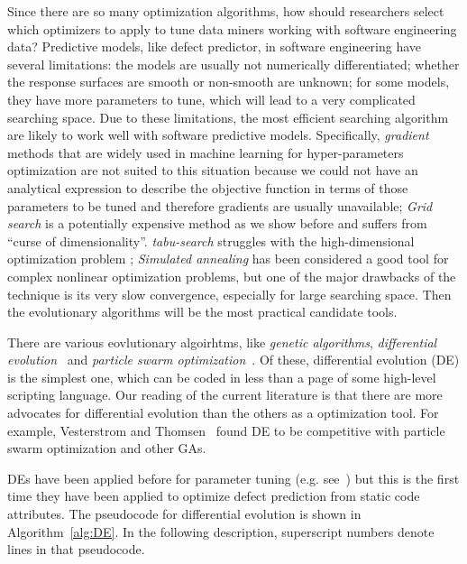 Since there are so many optimization algorithms, how should researchers
select which optimizers to apply to tune data miners working 
with software engineering data? Predictive models, like defect predictor,
in software engineering have several limitations: the models are usually not
numerically differentiated; whether the response surfaces are smooth or non-smooth are unknown;
for some models, they have more parameters to tune, which will lead to a very complicated searching space. Due to these limitations, the most efficient searching algorithm
are likely to work well with software predictive models. Specifically,
{\em gradient} methods that are widely used in machine learning\cite{bengio2000gradient,maclaurin2015gradient} for 
hyper-parameters optimization are not suited to this situation because we could not have an analytical expression
to describe the objective function in terms of those parameters to be tuned and therefore gradients are usually unavailable; 
{\em Grid search} is a potentially expensive method as we show before\cite{tantithamthavorn2016automated} and suffers from ``curse of dimensionality''.
{\em tabu-search} struggles with
the high-dimensional optimization problem \cite{mayer1998tabu}; {\em Simulated annealing} 
has been considered a good tool for complex nonlinear optimization problems\cite{fea02a,me07f}, but one of the major drawbacks of the technique is its very slow convergence, especially for large searching space\cite{ram1996parallel}. Then the evolutionary algorithms will be
the most practical candidate tools.

There are various eovlutionary algoirhtms, like {\em genetic algorithms}\cite{goldberg79}, {\em differential evolution}~\cite{storn1997differential} and 
{\em particle swarm optimization}~\cite{pan08}.
Of these,   
differential evolution (DE) is the simplest one, which can be coded in less than a page of some high-level scripting language. Our reading of the current literature is that there are more  advocates for
differential evolution than
  the others as a optimization tool. For example,  Vesterstrom and Thomsen~\cite{Vesterstrom04} found DE to be competitive with 
  particle swarm optimization and other GAs. 
   
DEs have been applied before for   parameter tuning (e.g. see~\cite{omran2005differential, chiha2012tuning}) but this is the first time they have been applied to
optimize defect prediction from static code attributes.  
The pseudocode for differential evolution is shown in Algorithm~\ref{alg:DE}.
In the following description, 
    superscript numbers denote lines in that pseudocode.

